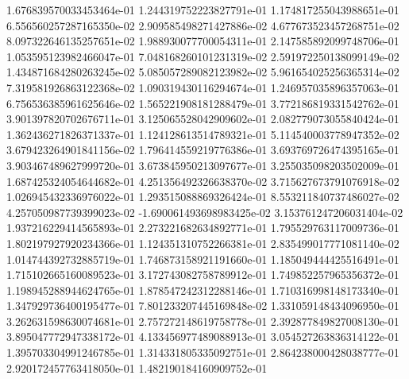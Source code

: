 1.676839570033453464e-01	1.244319752223827791e-01	1.174817255043988651e-01	6.556560257287165350e-02	2.909585498271427886e-02	4.677673523457268751e-02	8.097322646135257651e-02	1.988930077700054311e-01	2.147585892099748706e-01	1.053595123982466047e-01	7.048168260101231319e-02	2.591972250138099149e-02	1.434871684280263245e-02	5.085057289082123982e-02	5.961654025256365314e-02	7.319581926863122368e-02	1.090319430116294674e-01	1.246957035896357063e-01	6.756536385961625646e-02	1.565221908181288479e-01	3.772186819331542762e-01	3.901397820702676711e-01	3.125065528042909602e-01	2.082779073055840424e-01	1.362436271826371337e-01	1.124128613514789321e-01	5.114540003778947352e-02	3.679423264901841156e-02	1.796414559219776386e-01	3.693769726474395165e-01	3.903467489627999720e-01	3.673845950213097677e-01	3.255035098203502009e-01	1.687425324054644682e-01	4.251356492326638370e-02	3.715627673791076918e-02	1.026945432336976022e-01	1.293515088869326424e-01	8.553211840737486027e-02	4.257050987739399023e-02	-1.690061493698983425e-02	3.153761247206031404e-02	1.937216229414565893e-01	2.273221682634892771e-01	1.795529763117009736e-01	1.802197927920234366e-01	1.124351310752266381e-01	2.835499017771081140e-02	1.014744392732885719e-01	1.746873158921191660e-01	1.185049444425516491e-01	1.715102665160089523e-01	3.172743082758789912e-01	1.749852257965356372e-01	1.198945288944624765e-01	1.878547242312288146e-01	1.710316998148173340e-01	1.347929736400195477e-01	7.801233207445169848e-02	1.331059148434096950e-01	3.262631598630074681e-01	2.757272148619758778e-01	2.392877849827008130e-01	3.895047772947338172e-01	4.133456977489088913e-01	3.054527263836314122e-01	1.395703304991246785e-01	1.314331805335092751e-01	2.864238000428038777e-01	2.920172457763418050e-01	1.482190184160909752e-01
